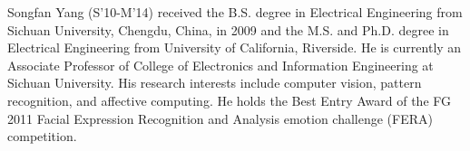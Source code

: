 \documentclass[10pt,journal]{IEEEtran}
\begin{document}
\ifCLASSOPTIONcaptionsoff
  \newpage
\fi





%
%
%




\begin{IEEEbiography}{Songfan Yang}
(S'10-M'14) received the B.S. degree in Electrical Engineering from Sichuan University, Chengdu, China, in 2009 and the M.S. and Ph.D. degree in Electrical Engineering from University of California, Riverside. He is currently an Associate Professor of College of Electronics and Information Engineering at Sichuan University. His research interests include computer vision, pattern recognition, and affective computing. He holds the Best Entry Award of the FG 2011 Facial Expression Recognition and Analysis emotion challenge (FERA) competition.
\end{IEEEbiography}
\end{document}
